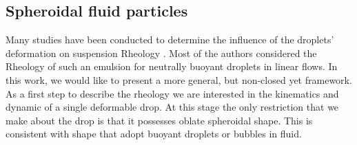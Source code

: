 \subsection{Spheroidal fluid particles}

Many studies have been conducted to determine the influence of the droplets' deformation on suspension Rheology \citet{goddard1967nonlinear,lhuillier1987phenomenology,maffettone1998equation}.
Most of the authors considered the Rheology of such an emulsion for neutrally buoyant droplets in linear flows. 
In this work, we would like to present a more general, but non-closed yet framework. 
As a first step to describe the rheology we are interested in the kinematics   and dynamic of a single deformable drop. 
At this stage the only restriction that we make about the drop is that it possesses oblate spheroidal shape. 
This is consistent with shape that adopt buoyant droplets or bubbles in fluid. 

